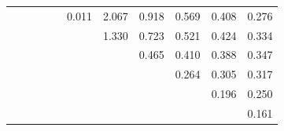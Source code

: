 \begin{table}[H]
\begin{tabular}{ccccccccccc}
     &                            &           &       &       & 0.011 & 2.067 & 0.918 & 0.569 & 0.408 & 0.276 \\
&  &           &       &       &       & 1.330 & 0.723 & 0.521 & 0.424 & 0.334 \\
 &  &           &       &       &       &       & 0.465 & 0.410 & 0.388 & 0.347 \\
 & &           &       &       &       &       &       & 0.264 & 0.305 & 0.317 \\
&  &     &   &       &       &       &       &       & 0.196 & 0.250 \\
 &        &           &       &       &       &       &       &       &       & 0.161\\
 \bottomrule
    \end{tabular}
    \end{table}

